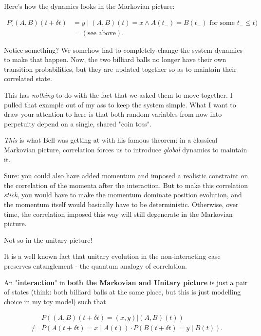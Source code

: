 \documentclass{article}
\begin{document}
Here's how the dynamics looks in the Markovian picture:

\begin{align*}
P((A,B)(t+\delta t) &= y \mid (A,B)(t)=x \land A(t_-) = B(t_-) \text{ for some } t_- \leq t) \\
&= (\text{see above}).
\end{align*}

Notice something? We somehow had to completely change the system dynamics to make that happen. Now, the two billiard balls no longer have their own transition probabilities, but they are updated together so as to maintain their correlated state.

This has \textit{nothing} to do with the fact that we asked them to move together. I pulled that example out of my ass to keep the system simple. What I want to draw your attention to here is that both random variables from now into perpetuity depend on a single, shared "coin toss".

\textit{This} is what Bell was getting at with his famous theorem: in a classical Markovian picture, correlation forces us to introduce \textit{global} dynamics to maintain it.

Sure: you could also have added momentum and imposed a realistic constraint on the correlation of the momenta after the interaction. But to make this correlation \textit{stick}, you would have to make the momentum dominate position evolution, and the momentum itself would basically have to be deterministic. Otherwise, over time, the correlation imposed this way will still degenerate in the Markovian picture.

Not so in the unitary picture!

It is a well known fact \cite{Hulpke_2006} that unitary evolution in the non-interacting case preserves entanglement - the quantum analogy of correlation.

An "\textbf{interaction}" in \textbf{both the Markovian and Unitary picture} is just a pair of states (think: both billiard balls at the same place, but this is just modelling choice in my toy model) such that

\begin{mdframed}
\begin{align*}
&P((A,B)(t+\delta t) = (x,y) | (A,B)(t)) \\ \neq &P(A(t+\delta t) = x\mid A(t))\cdot P(B(t+\delta t)=y \mid B(t)).
\end{align*}
\end{mdframed}
\end{document}
